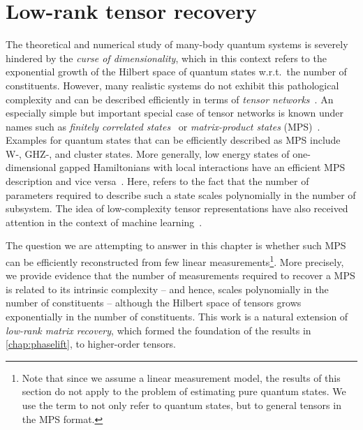 
\chapter{Low-rank tensor recovery}%
\label{chap:tensors}


The theoretical and numerical study of many-body quantum systems is severely hindered by the \emph{curse of dimensionality}, which in this context refers to the exponential growth of the Hilbert space of quantum states w.r.t.\ the number of constituents.
However, many realistic systems do not exhibit this pathological complexity and can be described efficiently in terms of \emph{tensor networks}~\cite{Bridgeman_2017_HandWaving,Orus_2014_Practical}.
An especially simple but important special case of tensor networks is known under names such as \emph{finitely correlated states}~\cite{Fannes_1992_Finitely} or \emph{matrix-product states} (MPS)~\cite{Garcia_2006_Matrix,Verstraete_2008_Matrix}.
Examples for quantum states that can be efficiently described as MPS include W-, GHZ-, and cluster states.
More generally, low energy states of one-dimensional gapped Hamiltonians with local interactions have an efficient MPS description and vice versa~\cite{Hastings_2006_Solving,Verstraete_2006_Matrix,Eisert_2010_Colloquium,Arad_2013_Area,Arad_2016_Rigorous}.
Here,  refers to the fact that the number of parameters required to describe such a state scales polynomially in the number of subsystem.
The idea of low-complexity tensor representations have also received attention in the context of machine learning~\cite{Novikov_2015_Tensorizing,Tai_2015_Convolutional,Yang_2016_Deep,Stoudenmire_2016_Supervised,Chen_2017_Parallelized,Bengua_2015_Optimal,Bengua_2016_Matrix}.

The question we are attempting to answer in this chapter is whether such MPS can be efficiently reconstructed from few linear measurements\footnote{%
  Note that since we assume a linear measurement model, the results of this section do not apply to the problem of estimating pure quantum states.
  We use the term  to not only refer to quantum states, but to general tensors in the MPS format.
}.
More precisely, we provide evidence that the number of measurements required to recover a MPS is related to its intrinsic complexity -- and hence, scales polynomially in the number of constituents -- although the Hilbert space of tensors grows exponentially in the number of constituents.
This work is a natural extension of \emph{low-rank matrix recovery}, which formed the foundation of the results in \cref{chap:phaselift}, to higher-order tensors.\\




